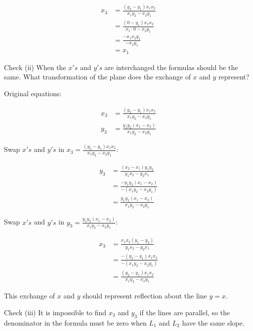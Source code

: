 \documentclass[9pt]{article}
\begin{document}
\begin{align*}
  x_3 &= \frac{(y_2 - y_1) x_1 x_2}{x_1 y_2 - x_2 y_1} \\
      &= \frac{(0 - y_1) x_1 x_2}{x_1 \cdot 0 - x_2 y_1} \\
      &= \frac{- x_1 x_2 y_1}{- x_2 y_1} \\
      &= x_1
\end{align*}

\begin{tcolorbox}
  Check (ii) When the $x's$ and $y's$ are interchanged the formulas should be the same. What transformation of the plane does the exchange of $x$ and $y$ represent?\\
\end{tcolorbox}

Original equations:

\begin{align*}
  x_3 &= \frac{(y_2 - y_1) x_1 x_2}{x_1 y_2 - x_2 y_1} \\
  y_3 &= \frac{y_1 y_2 (x_1 - x_2)}{x_1 y_2 - x_2 y_1}
\end{align*}

Swap $x's$ and $y's$ in $x_3 = \frac{(y_2 - y_1) x_1 x_2}{x_1 y_2 - x_2 y_1}$:

\begin{align*}
  y_3 &= \frac{(x_2 - x_1) y_1 y_2}{y_1 x_2 - y_2 x_1} \\
      &= \frac{- y_1 y_2 (x_1 - x_2)}{-(x_1 y_2 - x_2 y_1)} \\
      &= \frac{y_1 y_2 (x_1 - x_2)}{x_1 y_2 - x_2 y_1}
\end{align*}

Swap $x's$ and $y's$ in $y_3 = \frac{y_1 y_2 (x_1 - x_2)}{x_1 y_2 - x_2 y_1}$:

\begin{align*}
  x_3 &= \frac{x_1 x_2 (y_1 - y_2)}{y_1 x_2 - y_2 x_1} \\
      &= \frac{-(y_2 - y_1) x_1 x_2}{-(x_1 y_2 - x_2 y_1)} \\
      &= \frac{(y_2 - y_1) x_1 x_2}{x_1 y_2 - x_2 y_1}
\end{align*}

This exchange of $x$ and $y$ should represent reflection about the line $y = x$.

\begin{tcolorbox}
  Check (iii) It is impossible to find $x_3$ and $y_3$ if the lines are parallel, so the denominator in the formula must be zero when $L_1$ and $L_2$ have the same slope.\\
\end{tcolorbox}
\end{document}
